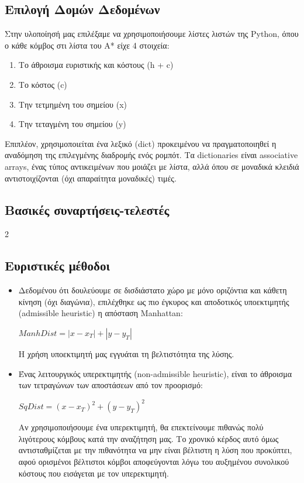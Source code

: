 \documentclass[a4paper,9pt]{article}
\begin{document}
\subsection{Επιλογή Δομών Δεδομένων}
Στην υλοποίησή μας επιλέξαμε να χρησιμοποιήσουμε λίστες λιστών της Python,
όπου ο κάθε κόμβος στι λίστα του A* είχε 4 στοιχεία:
\begin{enumerate}
    \item Το άθροισμα ευριστικής και κόστους (h + c)
    \item Το κόστος (c)
    \item Την τετμημένη του σημείου (x)
    \item Την τεταγμένη του σημείου (y)
\end{enumerate}

Επιπλέον, χρησιμοποιείται ένα λεξικό (dict) προκειμένου να
πραγματοποιηθεί η αναδόμηση της επιλεγμένης διαδρομής ενός ρομπότ. Τα
dictionaries είναι associative arrays, ένας τύπος αντικειμένων που μοιάζει με
λίστα, αλλά όπου σε μοναδικά κλειδιά αντιστοιχίζονται (όχι απαραίτητα
μοναδικές) τιμές.

\subsection{Βασικές συναρτήσεις-τελεστές}
2

\subsection{Ευριστικές μέθοδοι}
\begin{itemize}
\item
Δεδομένου ότι δουλεύουμε σε δισδιάστατο χώρο με μόνο οριζόντια και κάθετη
κίνηση (όχι διαγώνια), επιλέχθηκε ως πιο έγκυρος και αποδοτικός υποεκτιμητής
(admissible heuristic) η απόσταση Manhattan:
\begin{center} $ManhDist = |x - x_T| + |y - y_T|$ \end{center}
Η χρήση υποεκτιμητή μας εγγυάται τη βελτιστότητα της λύσης.

\item
Ένας
λειτουργικός υπερεκτιμητής (non-admissible heuristic), είναι το άθροισμα των
τετραγώνων των αποστάσεων από τον προορισμό:
\begin{center} $SqDist = (x - x_T)^2 + (y - y_T)^2$ \end{center}
Αν χρησιμοποιήσουμε ένα υπερεκτιμητή, θα επεκτείνουμε πιθανώς πολύ λιγότερους
κόμβους κατά την αναζήτηση μας. Το χρονικό κέρδος αυτό όμως αντισταθμίζεται με
την πιθανότητα να μην είναι βέλτιστη η λύση που προκύπτει, αφού ορισμένοι
βέλτιστοι κόμβοι αποφεύγονται λόγω του αυξημένου συνολικού κόστους που
εισάγεται με τον υπερεκτιμητή.
\end{itemize}
\end{document}
